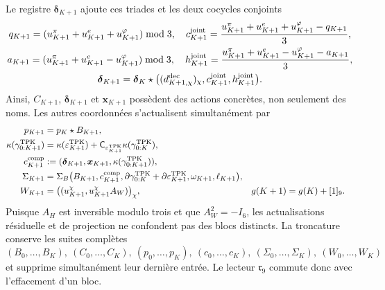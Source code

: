 Le registre \(\boldsymbol\delta_{K+1}\) ajoute ces triades et les deux cocycles conjoints
\begin{equation}
\label{eq:continuo-comun-update-triadas-carry-conjunto}
 \begin{gathered}
 q_{K+1}=(u_{K+1}^\pi+u_{K+1}^e+u_{K+1}^\varphi)\bmod3,
 \quad
 c_{K+1}^{\rm joint}=\frac{u_{K+1}^\pi+u_{K+1}^e+u_{K+1}^\varphi-q_{K+1}}3,\\
 a_{K+1}=(u_{K+1}^\pi+u_{K+1}^e-u_{K+1}^\varphi)\bmod3,
 \quad
 h_{K+1}^{\rm joint}=\frac{u_{K+1}^\pi+u_{K+1}^e-u_{K+1}^\varphi-a_{K+1}}3,\\
 \boldsymbol\delta_{K+1}
 =\boldsymbol\delta_K\star
 \bigl((d_{K+1,\chi}^{\rm dec})_\chi,
       c_{K+1}^{\rm joint},h_{K+1}^{\rm joint}\bigr).
 \end{gathered}
\end{equation}
Ainsi, \(C_{K+1}\), \(\boldsymbol\delta_{K+1}\) et \(\boldsymbol x_{K+1}\) possèdent des actions concrètes, non seulement des noms. Les autres coordonnées s'actualisent simultanément par
\begin{align}
 p_{K+1}&=p_K\star B_{K+1},
 \label{eq:continuo-comun-update-prefijo-tpk}\\
 \kappa(\gamma^{\rm TPK}_{0:K+1})
 &=\kappa(\varepsilon^{\rm TPK}_{K+1})
   +\mathsf C_{\varepsilon^{\rm TPK}_{K+1}}
    \kappa(\gamma^{\rm TPK}_{0:K}),
 \label{eq:continuo-comun-update-carry-lector-tpk}\\
 c_{K+1}^{\rm comp}
 &:=(\boldsymbol\delta_{K+1},\boldsymbol x_{K+1},
       \kappa(\gamma^{\rm TPK}_{0:K+1})),
 \label{eq:continuo-comun-update-carry-compacto-tpk}\\
 \Sigma_{K+1}
 &=\Sigma_B\bigl(
 B_{K+1},c_{K+1}^{\rm comp},
 \partial\gamma^{\rm TPK}_{0:K}
 +\partial\varepsilon^{\rm TPK}_{K+1},
 \omega_{K+1},\ell_{K+1}\bigr),
 \label{eq:continuo-comun-update-firma-tpk}\\
 W_{K+1}
 &=\bigl((u_{K+1}^\chi,u_{K+1}^\chi A_W)\bigr)_\chi,
 &g(K+1)&=g(K)+[1]_9.
 \label{eq:continuo-comun-update-witt-fase-tpk}
\end{align}
Puisque \(A_H\) est inversible modulo trois et que \(A_W^2=-I_6\), les actualisations résiduelle et de projection ne confondent pas des blocs distincts. La troncature conserve les suites complètes
\[
 (B_0,\ldots,B_K),\ (C_0,\ldots,C_K),\
 (p_0,\ldots,p_K),\ (c_0,\ldots,c_K),\
 (\Sigma_0,\ldots,\Sigma_K),\ (W_0,\ldots,W_K)
\]
et supprime simultanément leur dernière entrée. Le lecteur \(\mathfrak r_9\) commute donc avec l'effacement d'un bloc.

